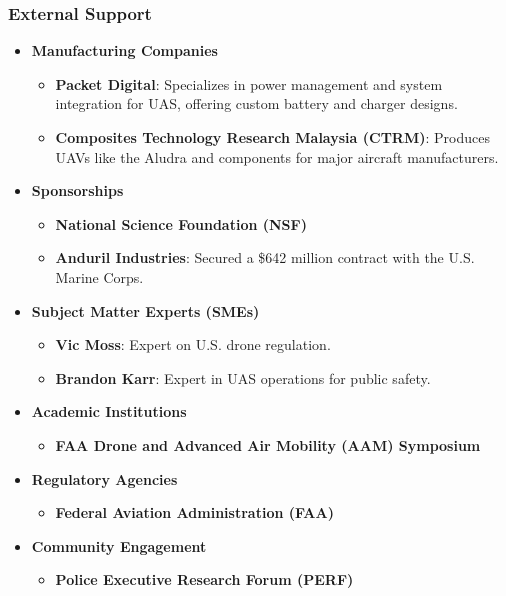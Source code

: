 \documentclass{article}
\begin{document}
\subsubsection{External Support}
\begin{itemize}
    \item \textbf{Manufacturing Companies}
    \begin{itemize}
        \item \textbf{Packet Digital}: Specializes in power management and system integration for UAS, offering custom battery and charger designs.
        \item \textbf{Composites Technology Research Malaysia (CTRM)}: Produces UAVs like the Aludra and components for major aircraft manufacturers.
    \end{itemize}
    \item \textbf{Sponsorships}
    \begin{itemize}
        \item \textbf{National Science Foundation (NSF)}
        \item \textbf{Anduril Industries}: Secured a \$642 million contract with the U.S. Marine Corps.
    \end{itemize}
    \item \textbf{Subject Matter Experts (SMEs)}
    \begin{itemize}
        \item \textbf{Vic Moss}: Expert on U.S. drone regulation.
        \item \textbf{Brandon Karr}: Expert in UAS operations for public safety.
    \end{itemize}
    \item \textbf{Academic Institutions}
    \begin{itemize}
        \item \textbf{FAA Drone and Advanced Air Mobility (AAM) Symposium}
    \end{itemize}
    \item \textbf{Regulatory Agencies}
    \begin{itemize}
        \item \textbf{Federal Aviation Administration (FAA)}
    \end{itemize}
    \item \textbf{Community Engagement}
    \begin{itemize}
        \item \textbf{Police Executive Research Forum (PERF)}
    \end{itemize}
\end{itemize}
\end{document}
